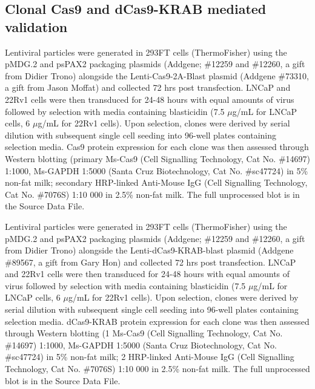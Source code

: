 \subsection{Clonal  Cas9 and dCas9-KRAB mediated validation}

Lentiviral particles were generated in 293FT cells (ThermoFisher) using the pMDG.2 and psPAX2 packaging plasmids (Addgene; \#12259 and \#12260, a gift from Didier Trono) alongside the Lenti-Cas9-2A-Blast plasmid (Addgene \#73310, a gift from Jason Moffat) and collected 72 hrs post transfection.
LNCaP and 22Rv1 cells were then transduced for 24-48 hours with equal amounts of virus followed by selection with media containing blasticidin (7.5 $\mu$g/mL for LNCaP cells, 6 $\mu$g/mL for 22Rv1 cells).
Upon selection, clones were derived by serial dilution with subsequent single cell seeding into 96-well plates containing selection media.
Cas9 protein expression for each clone was then assessed through Western blotting (primary Ms-Cas9 (Cell Signalling Technology, Cat No. \#14697) 1:1000, Ms-GAPDH 1:5000 (Santa Cruz Biotechnology, Cat No. \#sc47724) in 5\% non-fat milk; secondary HRP-linked Anti-Mouse IgG (Cell Signalling Technology, Cat No. \#7076S) 1:10 000 in 2.5\% non-fat milk.
The full unprocessed blot is in the Source Data File.

Lentiviral particles were generated in 293FT cells (ThermoFisher) using the pMDG.2 and psPAX2 packaging plasmids (Addgene; \#12259 and \#12260, a gift from Didier Trono) alongside the Lenti-dCas9-KRAB-blast plasmid (Addgene \#89567, a gift from Gary Hon) and collected 72 hrs post transfection.
LNCaP and 22Rv1 cells were then transduced for 24-48 hours with equal amounts of virus followed by selection with media containing blasticidin (7.5 $\mu$g/mL for LNCaP cells, 6 $\mu$g/mL for 22Rv1 cells).
Upon selection, clones were derived by serial dilution with subsequent single cell seeding into 96-well plates containing selection media.
dCas9-KRAB protein expression for each clone was then assessed through Western blotting (1 \textdegree Ms-Cas9 (Cell Signalling Technology, Cat No. \#14697) 1:1000, Ms-GAPDH 1:5000 (Santa Cruz Biotechnology, Cat No. \#sc47724) in 5\% non-fat milk; 2 \textdegree HRP-linked Anti-Mouse IgG (Cell Signalling Technology, Cat No. \#7076S) 1:10 000 in 2.5\% non-fat milk.
The full unprocessed blot is in the Source Data File.

